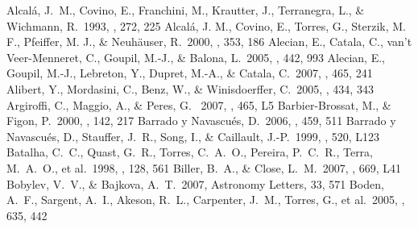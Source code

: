 \documentclass[11pt,twoside]{book}
\begin{document}

%
%

\begin{thebibliography}{}

Alcal\'a, J.~M., Covino, E., Franchini, M., Krautter, J., Terranegra, L., \&
Wichmann, R.\ 1993, \aap, 272, 225
Alcal\'a, J. M., Covino, E., Torres, G., Sterzik, M. F., Pfeiffer, M. J., \&
Neuh{\"a}user, R.\ 2000, \aap, 353, 186
Alecian, E., Catala, C., van't Veer-Menneret, C., Goupil, M.-J., \& Balona, L.\
2005, \aap, 442, 993
Alecian, E., Goupil, M.-J., Lebreton, Y., Dupret, M.-A., \& Catala, C.\ 2007,
\aap, 465, 241
Alibert, Y., Mordasini, C., Benz, W., \& Winisdoerffer, C.\ 2005, \aap, 434, 343
\bibitem[Argiroffi et al.(2007)]{argiroffi07}
Argiroffi, C., Maggio, A., \& Peres, G. \ 2007, \aap, 465, L5
Barbier-Brossat, M., \& Figon, P.\ 2000, \aaps, 142, 217
Barrado y Navascu{\'e}s, D.\ 2006, \aap, 459, 511
{{Barrado y Navascu{\' e}s}, D., {Stauffer}, J.~R., {Song}, I., \& {Caillault},
J.-P.}\ 1999, \apjl, 520, {L123}
Batalha, C.~C., {Quast}, G.~R., {Torres}, C.~A.~O., {Pereira}, P.~C.~R.,
{Terra}, M.~A.~O.,
et al.\ 1998, \aaps, 128, 561
Biller, B.~A., \& Close, L.~M.\ 2007, \apjl, 669, L41
Bobylev, V.~V., \& Bajkova, A.~T.\ 2007, Astronomy Letters, 33, 571
\bibitem[Boden et al.(2005)]{bolden05}
Boden, A.~F., {Sargent}, A.~I., {Akeson}, R.~L., {Carpenter}, J.~M., {Torres}, G.,
et al.\ 2005, \apj, 635, 442

\end{thebibliography}
\end{document}
